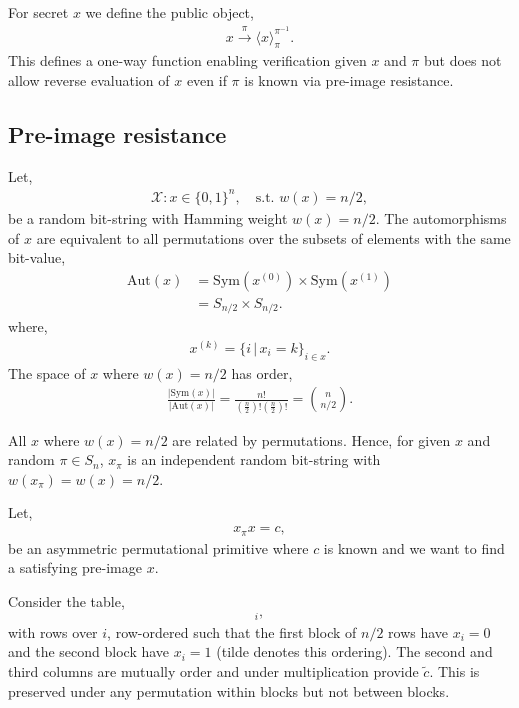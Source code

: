 \documentclass[twocolumn, aps, amsmath, amssymb, nofootinbib, superscriptaddress, longbibliography, doublefloatfix, table-of-contents, eqsecnum, rmp]{revtex4-2}
\def\selfbraid#1#2#3{\langle#1\rangle_{#2}^{#3}}
\begin{document}
For secret $x$ we define the public object,
\begin{align} \label{eq:one_way_sum}
	x \xrightarrow{\pi} \selfbraid{x}{\pi}{\pi^{-1}}.
\end{align}
This defines a one-way function enabling verification given $x$ and $\pi$ but does not allow reverse evaluation of $x$ even if $\pi$ is known via pre-image resistance.

\subsection{Pre-image resistance}

Let,
\begin{align}
	\mathcal{X}: x\in\{0,1\}^n,\quad \mathrm{s.t.}\,\,w(x)=n/2,
\end{align}
be a random bit-string with Hamming weight \mbox{$w(x)=n/2$}. The automorphisms of $x$ are equivalent to all permutations over the subsets of elements with the same bit-value,
\begin{align}
	\mathrm{Aut}(x) &= \mathrm{Sym}(x^{(0)}) \times \mathrm{Sym}(x^{(1)}) \nonumber\\
	&= S_{n/2}\times S_{n/2}.
\end{align}
where,
\begin{align}
	x^{(k)}=\{i\,|\, x_i=k\}_{i\in x}.
\end{align}
The space of $x$ where $w(x)=n/2$ has order,
\begin{align}
	\frac{|\mathrm{Sym}(x)|}{|\mathrm{Aut}(x)|} = \frac{n!}{(\frac{n}{2})!(\frac{n}{2})!} = \binom{n}{n/2}.
\end{align}

All $x$ where $w(x)=n/2$ are related by permutations. Hence, for given $x$ and random $\pi\in S_n$, $x_\pi$ is an independent random bit-string with $w(x_\pi)=w(x)=n/2$.

Let,
\begin{align}
	x_\pi x = c,
\end{align}
be an asymmetric permutational primitive where $c$ is known and we want to find a satisfying pre-image $x$.

Consider the table,
\begin{align}
	[x_\pi,\tilde{x},\tilde{x}\oplus \tilde{c}]_i,
\end{align}
with rows over $i$, row-ordered such that the first block of $n/2$ rows have $x_i=0$ and the second block have $x_i=1$ (tilde denotes this ordering). The second and third columns are mutually order and under multiplication provide $\tilde{c}$. This is preserved under any permutation within blocks but not between blocks.
\end{document}
